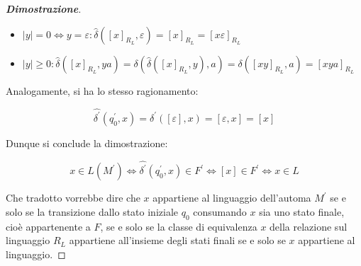 \documentclass[a4paper]{article}
\begin{document}
\begin{proof}[\textbf{Dimostrazione}]
		\begin{itemize}
			\item $|y| = 0 \iff y = \varepsilon : \hat{\delta} \left(\left[x\right]_{R_{L}}, \varepsilon\right) = \left[x\right]_{R_{L}} = \left[x\varepsilon\right]_{R_{L}}$
			
			\item $|y| \ge 0 : \hat{\delta}\left(\left[x\right]_{R_{L}}, ya\right) = \delta\left(\hat{\delta}\left(\left[x\right]_{R_{L}}, y\right), a\right) = \delta\left(\left[xy\right]_{R_{L}}, a\right) = \left[xya\right]_{R_{L}}$
		\end{itemize}
		
		\noindent
		Analogamente, si ha lo stesso ragionamento:
		
		\begin{equation*}
			\hat{\delta^{'}}\left(q_{0}^{'}, x\right) = \hat{\delta^{'}}\left(\left[\varepsilon\right], x\right) = \left[\varepsilon, x\right] = \left[x\right]
		\end{equation*}
		
		\noindent
		Dunque si conclude la dimostrazione:
		
		\begin{equation*}
			x \in L\left(M^{'}\right) \iff \hat{\delta^{'}}\left(q_{0}^{'}, x\right) \in F^{'} \iff \left[x\right] \in F^{'} \iff x \in L
		\end{equation*}
		
		\noindent
		Che tradotto vorrebbe dire che $x$ appartiene al linguaggio dell'automa $M^{'}$ se e solo se la transizione dallo stato iniziale $q_{0}$ consumando $x$ sia uno stato finale, cioè appartenente a $F$, se e solo se la classe di equivalenza $x$ della relazione sul linguaggio $R_{L}$ appartiene all'insieme degli stati finali se e solo se $x$ appartiene al linguaggio.
	\end{proof}
\end{document}
